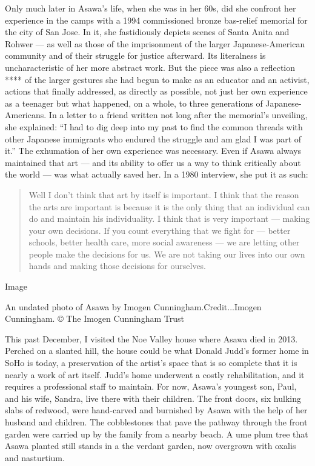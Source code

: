 Only much later in Asawa's life, when she was in her 60s, did she
confront her experience in the camps with a 1994 commissioned bronze
bas-relief memorial for the city of San Jose. In it, she fastidiously
depicts scenes of Santa Anita and Rohwer --- as well as those of the
imprisonment of the larger Japanese-American community and of their
struggle for justice afterward. Its literalness is uncharacteristic of
her more abstract work. But the piece was also a reflection **** of the
larger gestures she had begun to make as an educator and an activist,
actions that finally addressed, as directly as possible, not just her
own experience as a teenager but what happened, on a whole, to three
generations of Japanese-Americans. In a letter to a friend written not
long after the memorial's unveiling, she explained: ``I had to dig deep
into my past to find the common threads with other Japanese immigrants
who endured the struggle and am glad I was part of it.'' The exhumation
of her own experience was necessary. Even if Asawa always maintained
that art --- and its ability to offer us a way to think critically about
the world --- was what actually saved her. In a 1980 interview, she put
it as such:

\begin{quote}
Well I don't think that art by itself is important. I think that the
reason the arts are important is because it is the only thing that an
individual can do and maintain his individuality. I think that is very
important --- making your own decisions. If you count everything that we
fight for --- better schools, better health care, more social awareness
--- we are letting other people make the decisions for us. We are not
taking our lives into our own hands and making those decisions for
ourselves.
\end{quote}

Image

An undated photo of Asawa by Imogen Cunningham.Credit...Imogen
Cunningham. © The Imogen Cunningham Trust

This past December, I visited the Noe Valley house where Asawa died in
2013. Perched on a slanted hill, the house could be what Donald Judd's
former home in SoHo is today, a preservation of the artist's space that
is so complete that it is nearly a work of art itself. Judd's home
underwent a costly rehabilitation, and it requires a professional staff
to maintain. For now, Asawa's youngest son, Paul, and his wife, Sandra,
live there with their children. The front doors, six hulking slabs of
redwood, were hand-carved and burnished by Asawa with the help of her
husband and children. The cobblestones that pave the pathway through the
front garden were carried up by the family from a nearby beach. A ume
plum tree that Asawa planted still stands in a the verdant garden, now
overgrown with oxalis and nasturtium.

